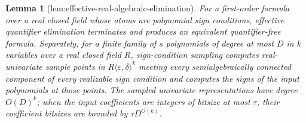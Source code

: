 \documentclass{article}
\newtheorem{lemma}{Lemma}
\begin{document}
\begin{lemma}[lem:effective-real-algebraic-elimination]\label{lem:effective-real-algebraic-elimination}
For a first-order formula over a real closed field whose atoms are polynomial sign conditions, effective quantifier elimination terminates and produces an equivalent quantifier-free formula.  Separately, for a finite family of \(s\) polynomials of degree at most \(D\) in \(k\) variables over a real closed field \(R\), sign-condition sampling computes real-univariate sample points in \(R\langle\varepsilon,\delta\rangle^k\) meeting every semialgebraically connected component of every realizable sign condition and computes the signs of the input polynomials at those points.  The sampled univariate representations have degree \(O(D)^k\); when the input coefficients are integers of bitsize at most \(\tau\), their coefficient bitsizes are bounded by \(\tau D^{O(k)}\).
\end{lemma}
\end{document}
